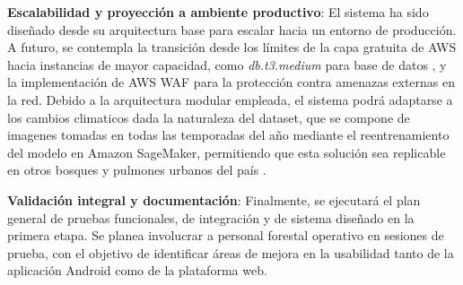     \textbf{Escalabilidad y proyección a ambiente productivo}: El sistema ha sido diseñado desde su arquitectura base para escalar hacia un entorno de producción. A futuro, se contempla la transición desde los límites de la capa gratuita de AWS \cite{aws_free_tier} hacia instancias de mayor capacidad, como \textit{db.t3.medium} para base de datos \cite{aws_calculator_prototipo, aws_calculator}, y la implementación de AWS WAF para la protección contra amenazas externas en la red. Debido a la arquitectura modular empleada, el sistema podrá adaptarse a los cambios climaticos dada la naturaleza del dataset, que se compone de imagenes tomadas en todas las temporadas del año \cite{delval_saenzromero2017descortezadores, vega2022mongabay} mediante el reentrenamiento del modelo en Amazon SageMaker, permitiendo que esta solución sea replicable en otros bosques y pulmones urbanos del país \cite{forestal2025bosques}.

    \textbf{Validación integral y documentación}: Finalmente, se ejecutará el plan general de pruebas funcionales, de integración y de sistema diseñado en la primera etapa. Se planea involucrar a personal forestal operativo en sesiones de prueba, con el objetivo de identificar áreas de mejora en la usabilidad tanto de la aplicación Android como de la plataforma web.
